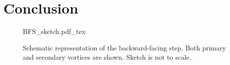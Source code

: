 \chapter{Conclusion}	\label{ch:conclusion}
\glsresetall
\begin{figure}[tb]
	\begin{center}
		\def\svgwidth{0.9\textwidth}
	{BFS_sketch.pdf_tex}
		\caption{Schematic representation of the backward-facing step. Both primary and secondary vortices are shown. Sketch is not to scale.}
		\label{BFSsketch}
	\end{center}	
\end{figure} 


